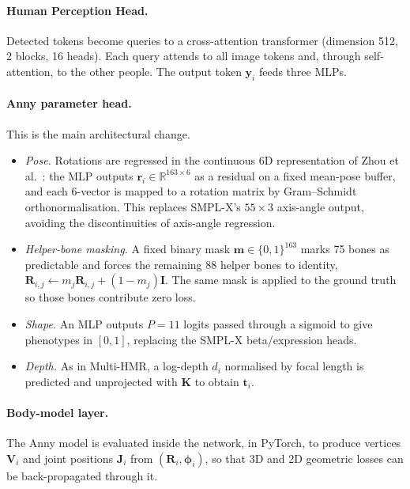 \paragraph{Human Perception Head.} Detected tokens become queries to a
cross-attention transformer (dimension 512, 2 blocks, 16 heads). Each query
attends to all image tokens and, through self-attention, to the other people.
The output token $\mathbf{y}_i$ feeds three MLPs.

\paragraph{Anny parameter head.} This is the main architectural change.
\begin{itemize}
  \item \emph{Pose.} Rotations are regressed in the continuous 6D
        representation of Zhou et al.~\cite{zhou2019continuity}: the MLP
        outputs $\mathbf{r}_i\in\mathbb{R}^{163\times 6}$ as a residual on a
        fixed mean-pose buffer, and each 6-vector is mapped to a rotation
        matrix by Gram--Schmidt orthonormalisation. This replaces SMPL-X's
        $55{\times}3$ axis-angle output, avoiding the discontinuities of
        axis-angle regression.
  \item \emph{Helper-bone masking.} A fixed binary mask
        $\mathbf{m}\in\{0,1\}^{163}$ marks 75 bones as predictable and forces
        the remaining 88 helper bones to identity,
        $\mathbf{R}_{i,j}\leftarrow m_j\mathbf{R}_{i,j}+(1-m_j)\mathbf{I}$.
        The same mask is applied to the ground truth so those bones contribute
        zero loss.
  \item \emph{Shape.} An MLP outputs $P{=}11$ logits passed through a sigmoid to
        give phenotypes in $[0,1]$, replacing the SMPL-X beta/expression heads.
  \item \emph{Depth.} As in Multi-HMR, a log-depth $d_i$ normalised by focal
        length is predicted and unprojected with $\mathbf{K}$ to obtain
        $\mathbf{t}_i$.
\end{itemize}

\paragraph{Body-model layer.} The Anny model is evaluated inside the network,
in PyTorch, to produce vertices $\mathbf{V}_i$ and joint positions
$\mathbf{J}_i$ from $(\mathbf{R}_i,\boldsymbol{\phi}_i)$, so that 3D and 2D
geometric losses can be back-propagated through it.

